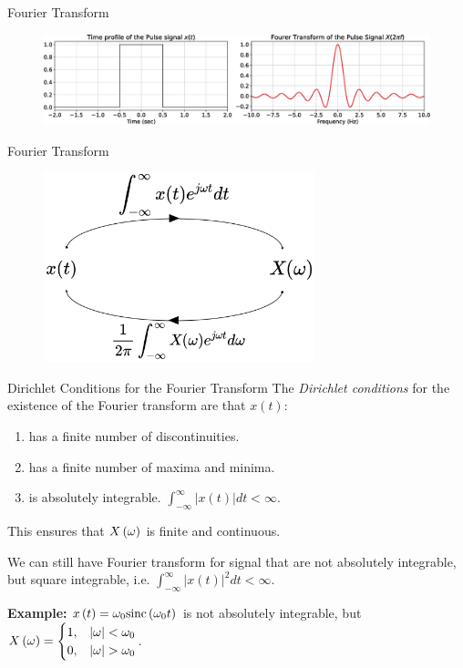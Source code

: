 \documentclass[aspectratio=169]{beamer}
\let\olditem\item
\renewcommand{\item}{\setlength{\itemsep}{\fill}\olditem}
\def\lp{\ensuremath\left(}
\def\rp{\ensuremath\right)}
\begin{document}
\begin{frame}[t]{Fourier Transform}
\begin{figure}
  \includegraphics[width=\textwidth]{img/ft-pulse.eps}
\end{figure}
\end{frame}


\begin{frame}[t]{Fourier Transform}
\begin{figure}
  \includegraphics[width=0.7\textwidth]{img/fouriertransform.png}
\end{figure}
\end{frame}


\begin{frame}[t]{Dirichlet Conditions for the Fourier Transform}
The \textit{Dirichlet conditions} for the existence of the Fourier transform are that $x(t)$:
\begin{enumerate}
  \item has a finite number of discontinuities.
  \item has a finite number of maxima and minima.
  \item is absolutely integrable. $\int_{-\infty}^{\infty} \vert x(t) \vert dt < \infty$. 
\end{enumerate}
This ensures that $X\lp \omega \rp$ is finite and continuous.

\vspace{0.5cm}

We can still have Fourier transform for signal that are not absolutely integrable, but square integrable, i.e. $\int_{-\infty}^{\infty} \vert x(t) \vert^2 dt < \infty$.

\vspace{0.5cm}

\textbf{Example:} $x\lp t \rp = \omega_0 \mathrm{sinc}\lp \omega_0 t\rp$ is not absolutely integrable, but $X\lp \omega \rp = \begin{cases} 1, & \vert \omega \vert < \omega_0 \\ 0, & \vert \omega \vert > \omega_0\end{cases}$.
\end{frame}
\end{document}
